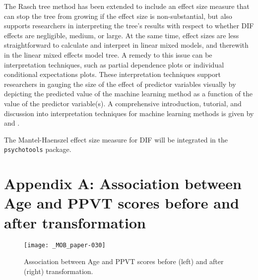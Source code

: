 \documentclass[doc,floatsintext,natbib]{apa7}
\begin{document}
The Rasch tree method has been extended to include an effect size measure that can stop the tree from growing if the effect size is non-substantial, but also supports researchers in interpreting the tree's results with respect to whether DIF effects are negligible, medium, or large. At the same time, effect sizes are less straightforward to calculate and interpret in linear mixed models, and therewith in the linear mixed effects model tree. A remedy to this issue can be interpretation techniques, such as partial dependence plots or individual conditional expectations plots. These interpretation techniques support researchers in gauging the size of the effect of predictor variables visually by depicting the predicted value of the machine learning method as a function of the value of the predictor variable(s). A comprehensive introduction, tutorial, and discussion into interpretation techniques for machine learning methods is given by \cite{Molnar2019} and \cite{Henninger2022c}. 

The Mantel-Haenszel effect size measure for DIF will be integrated in the \texttt{psychotools} package. 






\newpage
\appendix



\section{Appendix A: Association between Age and PPVT scores before and after transformation}
\label{sec:AppendixA}


\begin{figure}
\caption{Association between Age and PPVT scores before (left) and after (right) transformation.}
\texttt{[image: \_MOB\_paper-030]}
\end{figure}
\end{document}
